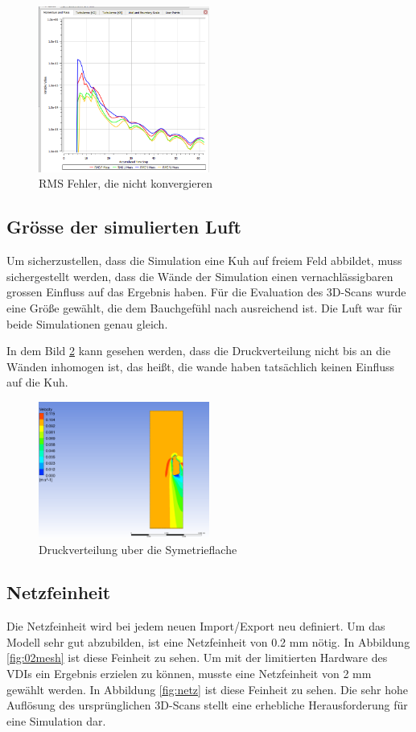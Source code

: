 \documentclass[a4paper,12pt]{article}
\begin{document}
\begin{figure}[h]
    \centering
    \includegraphics[width=0.5\textwidth]{rms.PNG}
    \caption{RMS Fehler, die nicht konvergieren}
    \label{fig:monitor1}
\end{figure}

\subsection{Grösse der simulierten Luft}
Um sicherzustellen, dass die Simulation eine Kuh auf freiem Feld abbildet, muss sichergestellt werden, dass die Wände der Simulation einen vernachlässigbaren grossen Einfluss auf das Ergebnis haben. Für die Evaluation des 3D-Scans wurde eine Größe gewählt, die dem Bauchgefühl nach ausreichend ist. Die Luft war für beide Simulationen genau gleich.

In dem Bild \ref{fig:p} kann gesehen werden, dass die Druckverteilung nicht bis an die Wänden inhomogen ist, das heißt, die wande haben tatsächlich keinen Einfluss auf die Kuh.

\begin{figure}[h]
    \centering
    \includegraphics[width=0.5\textwidth]{Unbenannt.PNG}
    \caption{Druckverteilung uber die Symetrieflache}
    \label{fig:p}
\end{figure}


\subsection{Netzfeinheit}
Die Netzfeinheit wird bei jedem neuen Import/Export neu definiert. Um das Modell sehr gut abzubilden, ist eine Netzfeinheit von 0.2 mm nötig. In Abbildung \ref{fig:02mesh} ist diese Feinheit zu sehen. Um mit der limitierten Hardware des VDIs ein Ergebnis erzielen zu können, musste eine Netzfeinheit von 2 mm gewählt werden.  In Abbildung \ref{fig:netz} ist diese Feinheit zu sehen. Die sehr hohe Auflösung des ursprünglichen 3D-Scans stellt eine erhebliche Herausforderung für eine Simulation dar.
\end{document}
